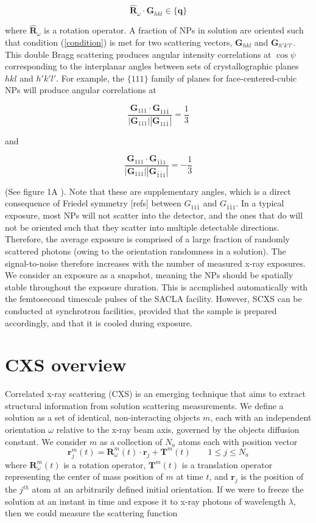 \documentclass [11pt,fleqn]{article}
\def \be {\begin{equation}}
\def \ee {\end{equation}}
\begin{document}
\be \label{condition}
\hat{\bm R}_\omega \cdot \bm G_{hkl} \in \{\bm q\}
\ee

where $\hat{\bm R}_\omega$ is a rotation operator. A fraction of NPs in solution are oriented such that condition (\ref{condition}) is met for two scattering vectors, $\bm G_{hkl}$ and $\bm G_{h'k'l'}$. This double Bragg scattering produces angular intensity correlations at $\cos \psi$ corresponding to the interplanar angles between sets of crystallographic planes $hkl$ and $h'k'l'$. For example, the $\{111\}$ family of planes for face-centered-cubic NPs will produce angular correlations at

\be
\frac{\bm G_{111} \cdot \bm G_{11\bar{1}}}{|\bm G_{111}| |\bm G_{11\bar{1}}| } = \frac{1}{3}
\ee

and

\be
\frac{\bm G_{111} \cdot \bm G_{\bar{1}\bar{1}1}}{|\bm G_{111}| |\bm G_{\bar{1}\bar{1}1}| } = -\frac{1}{3}
\ee

(See figure 1A ). Note that these are supplementary angles, which is a direct consequence of Friedel symmetry [refs] between $G_{11\bar{1}}$ and $G_{\bar{1}\bar{1}1}$.
In a typical exposure, most NPs will not scatter into the detector, and the ones that do will not be oriented such that they scatter into multiple detectable directions. Therefore, the average exposure is comprised of a large fraction of randomly scattered photons (owing to the orientation randomness in  a solution). The signal-to-noise therefore increases with the number of measured x-ray exposures. We consider an exposure as a snapshot, meaning the NPs should be spatially stable throughout the exposure duration. This is accmplished automatically with the femtosecond timescale pulses of the SACLA facility. However, SCXS can be conducted at synchrotron facilities, provided  that the sample is prepared accordingly, and that it is cooled during exposure.

\section{CXS overview}
Correlated x-ray scattering (CXS) is an emerging technique that aims to extract structural information from solution scattering measurements. We define a solution as a set of identical, non-interacting objects $m$, each with an independent orientation $\omega$ relative to the x-ray beam axis, governed by the objects diffusion constant. We consider $m$ as a collection of $N_a$ atoms each with position vector 
\be
\bm r^m_j (t) = \bm R^m_\omega (t)\cdot \bm r_j + \bm T^m(t) \qquad 1 \le j \le N_a
\ee 
where $\bm R^m_\omega(t)$ is a rotation operator, $\bm T^m (t)$ is a translation operator representing the center of mass position of $m$ at time $t$, and $\bm r_j$ is the position of the $j^{th}$ atom at an arbitrarily defined initial orientation. If we were to freeze the solution at an instant in time and expose it to x-ray photons of wavelength $\lambda$, then we could measure the scattering function
\end{document}
